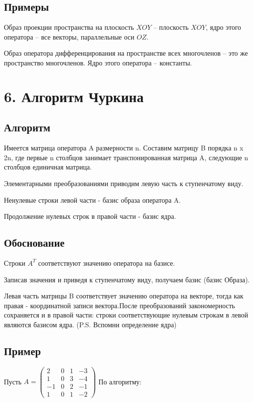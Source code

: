 \documentclass[12pt]{article}
\begin{document}
\subsection{Примеры}
Образ проекции пространства на плоскость $XOY$ – плоскость $XOY$, ядро этого оператора – все векторы, параллельные оси $OZ$.

Образ оператора дифференцирования на пространстве всех многочленов – это же пространство многочленов. Ядро этого оператора – константы.

\section{6. Алгоритм Чуркина}
\subsection{Алгоритм}
Имеется матрица оператора A размерности n. Составим матрицу B порядка n x 2n, где первые n столбцов занимает транспонированная матрица A, следующие n столбцов единичная матрица.

Элементарными преобразованиями приводим левую часть к ступенчатому виду.

Ненулевые строки левой части - базис образа оператора A.

Продолжение нулевых строк в правой части - базис ядра.

\subsection{Обоснование}
Строки $A^T$ соответствуют значению оператора на базисе.

Записав значения и приведя к ступенчатому виду, получаем базис (базис Образа).

Левая часть матрицы B соответствует значению оператора на векторе, тогда как правая - координатной записи вектора.После преобразований закономерность сохраняется и в правой части: строки соответствующие нулевым строкам в левой являются базисом ядра. (P.S. Вспомни определение ядра)

\subsection{Пример}
Пусть $A = \left(\begin{array}{cccc}
            2  & 0 & 1 & -3 \\
            1  & 0 & 3 & -4 \\
            -1 & 0 & 2 & -1 \\
            1  & 0 & 1 & -2
        \end{array} \right)$
По алгоритму:
\end{document}
